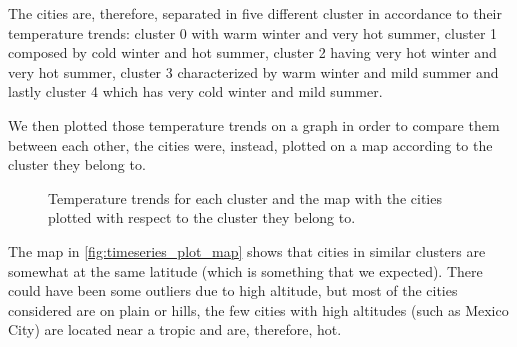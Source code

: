The cities are, therefore, separated in five different cluster in accordance to their temperature trends: cluster 0 with warm winter and very hot summer, cluster 1 composed by cold winter and hot summer, cluster 2 having very hot winter and very hot summer, cluster 3 characterized by warm winter and mild summer and lastly cluster 4 which has very cold winter and mild summer.

We then plotted those temperature trends on a graph in order to compare them between each other, the cities were, instead, plotted on a map according to the cluster they belong to.
\begin{figure}[H]
    \centering
    \caption{Temperature trends for each cluster and the map with the cities plotted with respect to the cluster they belong to.}
    \label{fig:timeseries_plot_map}
\end{figure}
The map in \autoref{fig:timeseries_plot_map} shows that cities in similar clusters are somewhat at the same latitude (which is something that we expected). There could have been some outliers due to high altitude, but most of the cities considered are on plain or hills, the few cities with high altitudes (such as Mexico City) are located near a tropic and are, therefore, hot.